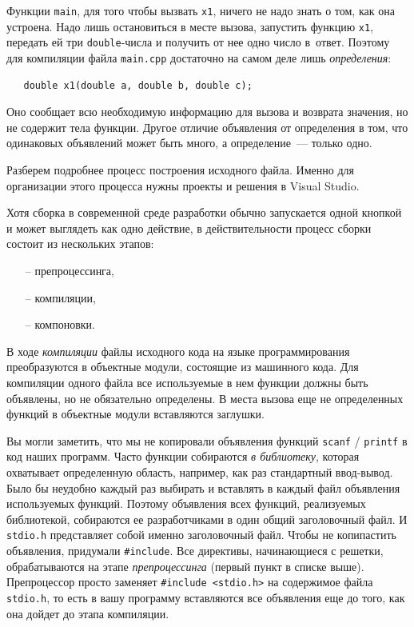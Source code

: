 \documentclass{article}
\begin{document}
Функции \texttt{main}, для того чтобы вызвать \texttt{x1}, ничего не надо знать о том, как она устроена. Надо лишь остановиться в месте вызова, запустить функцию \texttt{x1}, передать ей три \texttt{double}-числа  и получить от нее одно число в~ответ. Поэтому для компиляции файла \texttt{main.cpp} достаточно на самом деле лишь \emph{определения}:
\begin{verbatim}
   double x1(double a, double b, double c);
\end{verbatim}
Оно сообщает всю необходимую информацию для вызова и возврата значения, но не содержит тела функции. Другое отличие объявления от определения в том, что одинаковых объявлений может быть много, а определение~--- только одно.

Разберем подробнее процесс построения исходного файла. Именно для организации этого процесса нужны проекты и решения в Visual Studio. 

Хотя сборка в современной среде разработки обычно запускается одной кнопкой и может выглядеть как одно действие, в действительности процесс сборки состоит из нескольких этапов:
\begin{itemize}[nolistsep]
    \item[--] 
    препроцессинга, 
    \item[--]
    компиляции, 
    \item[--]
    компоновки. 
\end{itemize}

В ходе \emph{компиляции} файлы исходного кода на языке программирования преобразуются в объектные модули, состоящие из машинного кода. Для компиляции одного файла все используемые в нем функции должны быть объявлены, но не обязательно определены. В места вызова еще не определенных функций в объектные модули вставляются заглушки. 

Вы могли заметить, что мы не копировали объявления функций \texttt{scanf} / \texttt{printf} в код наших программ.  Часто функции собираются \emph{в библиотеку}, которая охватывает определенную область, например, как раз стандартный ввод-вывод. Было бы неудобно каждый раз выбирать и вставлять в каждый файл объявления используемых функций. Поэтому объявления всех функций, реализуемых библиотекой, собираются ее разработчиками в один общий заголовочный файл. И \texttt{stdio.h} представляет собой именно заголовочный файл. Чтобы не копипастить объявления, придумали \texttt{\#include}. Все директивы, начинающиеся с решетки, обрабатываются на этапе \emph{препроцессинга} (первый пункт в списке выше). Препроцессор просто заменяет \texttt{\#include <stdio.h>} на содержимое файла \texttt{stdio.h}, то есть в вашу программу вставляются все объявления еще до того, как она дойдет до этапа компиляции. 
\end{document}
